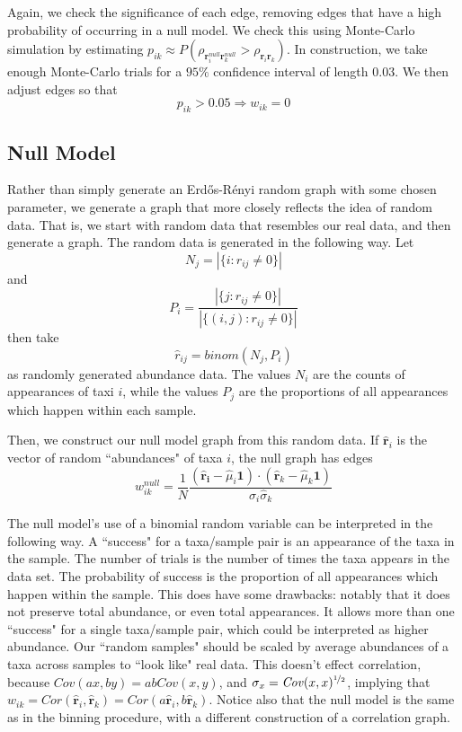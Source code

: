 \documentclass[10pt]{article}
\theoremstyle{definition}
\numberwithin{theorem}{section}
\numberwithin{definition}{section}
\numberwithin{lemma}{section}
\numberwithin{corollary}{section}
\numberwithin{clm}{section}
\numberwithin{rmk}{section}
\newcommand{\nhalf}{\nicefrac{1}{2}}
\renewcommand{\b}{\bm}
\begin{document}
Again, we check the significance of each edge, removing edges that have a high probability of occurring in a null model. We check this using Monte-Carlo simulation by estimating $p_{ik} \approx P(\rho_{\b{r}_i^{null}\b{r}_k^{null}} > \rho_{\b{r}_i\b{r}_k})$. In construction, we take enough Monte-Carlo trials for a $95\%$ confidence interval of length $0.03$. We then adjust edges so that
\[
p_{ik} > 0.05 \Rightarrow w_{ik} = 0
\]

\subsection{Null Model}\label{null}
Rather than simply generate an Erd\H{o}s-R\'{e}nyi random graph with some chosen parameter, we generate a graph that more closely reflects the idea of random data. That is, we start with random data that resembles our real data, and then generate a graph. The random data is generated in the following way. Let 
\[
N_j = |\{i: r_{ij} \neq 0\}|
\]
and 
\[
P_i = \frac{|\{j: r_{ij}\neq 0 \}|}{|\{(i,j): r_{ij}\neq 0 \}|}
\]
then take 
\[
\hat{r}_{ij} = \mathit{binom}(N_j,P_i)
\]
as randomly generated abundance data. The values $N_i$ are the counts of appearances of taxi $i$, while the values $P_j$ are the proportions of all appearances which happen within each sample. 
		
Then, we construct our null model graph from this random data. If $\hat{\b{r}}_i$ is the vector of random ``abundances" of taxa $i$, the null graph has edges
\[
w_{ik}^{null} = \frac{1}{N}\frac{(\b{\hat{\b{r}}_i}- \hat{\mu}_i\b{1}) \cdot (\hat{\b{r}}_k - \hat{\mu}_k\b{1})}{\hat{\sigma}_i \hat{\sigma}_k}
\]

The null model's use of a binomial random variable can be interpreted in the following way. A ``success" for a taxa/sample pair is an appearance of the taxa in the sample. The number of trials is the number of times the taxa appears in the data set. The probability of success is the proportion of all appearances which happen within the sample. This does have some drawbacks: notably that it does not preserve total abundance, or even total appearances. It allows more than one ``success" for a single taxa/sample pair, which could be interpreted as higher abundance. Our ``random samples" should be scaled by average abundances of a taxa across samples to ``look like" real data. This doesn't effect correlation, because $\mathit{Cov}(ax,by) = ab\mathit{Cov}(x,y)$, and $\sigma_x = \mathit{Cov}(x,x)^{\nhalf}$, implying that $w_{ik} = \mathit{Cor}(\hat{\b{r}}_i,\hat{\b{r}}_k) =  \mathit{Cor}(a\hat{\b{r}}_i,b\hat{\b{r}}_k)$. Notice also that the null model is the same as in the binning procedure, with a different construction of a correlation graph.
\end{document}
